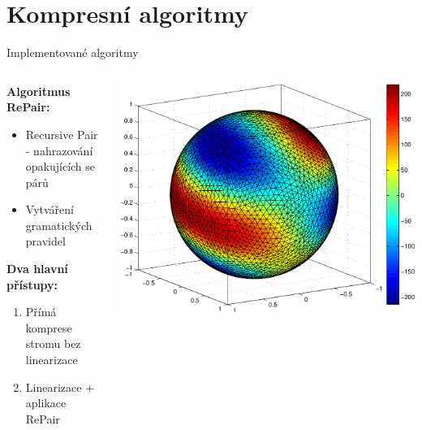 \documentclass[lualatex,hyperref={pdfencoding=auto}]{beamer}
\begin{document}
\section{Kompresní algoritmy}
\begin{frame}{Implementované algoritmy}
  \begin{columns}
    \begin{column}{0.5\textwidth}
      \textbf{Algoritmus RePair:}
      \begin{itemize}
        \item Recursive Pair - nahrazování opakujících se párů
        \item Vytváření gramatických pravidel
      \end{itemize}
      \vspace{2mm}
      \textbf{Dva hlavní přístupy:}
      \begin{enumerate}
        \item Přímá komprese stromu bez linearizace
        \item Linearizace + aplikace RePair
      \end{enumerate}
    \end{column}
    \begin{column}{0.5\textwidth}
      \includegraphics[width=\textwidth]{fig/sphere_mix_real.pdf}
    \end{column}
  \end{columns}
\end{frame}
\end{document}
